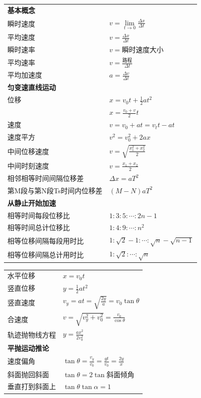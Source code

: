 \begin{tabularx}{\columnwidth}{XX}
  \multicolumn{2}{l}{\textbf{基本概念}} \\
  瞬时速度 & $v=\lim\limits_{t\to0} \frac{\Delta x}{\Delta t}$ \\
  平均速度 & $v=\frac{\Delta x}{\Delta t}$ \\
  瞬时速率 & $v=$瞬时速度大小 \\
  平均速率 & $v=\frac{\text{路程}}{\Delta t}$ \\
  平均加速度 & $a=\frac{\Delta v}{\Delta t}$ \\
  \multicolumn{2}{l}{\textbf{匀变速直线运动}} \\
  位移 & $x=v_0t+\frac{1}{2}at^2$ \\
   & $x=\frac{v_0+v}{2}t$ \\
  速度 & $v=v_0+at=v_tt-at$ \\
  速度平方 & $v^2=v_0^2+2ax$ \\
  中间位移速度 & $v=\sqrt{\frac{x_1^2+x_2^2}2}$ \\
  中间时刻速度 & $v=\frac{x_1+x_2}{2}$ \\
  相邻相等时间间隔位移差 & $\Delta x=aT^2$ \\
  第M段与第N段Ts时间内位移差 & $(M-N)aT^2$ \\
  \multicolumn{2}{l}{\textbf{从静止开始加速}} \\
  相等时间每段位移比 & $1:3:5:\cdots:2n-1$ \\
  相等时间总计位移比 & $1:4:9:\cdots:n^2$ \\
  相等位移间隔每段用时比 & $1:\sqrt2-1:\cdots:\sqrt n-\sqrt{n-1}$ \\
  相等位移间隔总计用时比 & $1:\sqrt2:\cdots:\sqrt n$ \\
\end{tabularx}
\medskip

\begin{tabularx}{\columnwidth}{XX}
  水平位移 & $x=v_0 t$ \\
  竖直位移 & $y=\frac12 a t^2$ \\
  竖直速度 & $v_y=a t=\sqrt{\frac{2y}{a}}=v_0\tan\theta$ \\
  合速度 & $v=\sqrt{v_y^2+v_0^2}=\frac{v_0}{\cos\theta}$ \\
  轨迹抛物线方程 & $y=\frac{ax^2}{2v_0^2}$ \\
  \multicolumn{2}{l}{\textbf{平抛运动推论}} \\
  速度偏角 & $\tan\theta=\frac{v_y}{v_0}=\frac{gt}{v_0}=\frac{2y}{x}$ \\
  斜面抛回斜面 & $\tan\theta=2\tan\text{斜面倾角}$ \\
  垂直打到斜面上 & $\tan\theta \tan\alpha = 1 $ \\
\end{tabularx}
\medskip

